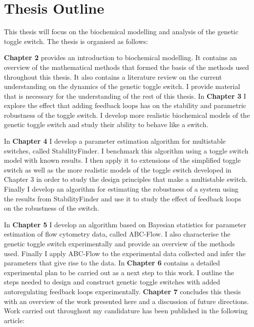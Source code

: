 
\section{Thesis Outline}

This thesis will focus on the biochemical modelling and analysis of the genetic toggle switch. The thesis is organised as follows:

\vskip 0.1in
\noindent \textbf{Chapter 2} provides an introduction to biochemical modelling. It contains an overview of the mathematical methods that formed the basis of the methods used throughout this thesis. It also contains a literature review on the current understanding on the dynamics of the genetic toggle switch. I provide material that is necessary for the understanding of the rest of this thesis. 
\vskip 0.1in
\noindent In \textbf{Chapter 3} I explore the effect that adding feedback loops has on the stability and parametric robustness of the toggle switch. I develop more realistic biochemical models of the genetic toggle switch and study their ability to behave like a switch.  

\vskip 0.1in
\noindent In \textbf{Chapter 4} I develop a parameter estimation algorithm for multistable switches, called StabilityFinder. I benchmark this algorithm using a toggle switch model with known results. I then apply it to extensions of the simplified toggle switch as well as the more realistic models of the toggle switch developed in Chapter 3 in order to study the design principles that make a multistable switch. Finally I develop an algorithm for estimating the robustness of a system using the results from StabilityFinder and use it to study the effect of feedback loops on the robustness of the switch.  

\vskip 0.1in
\noindent In \textbf{Chapter 5} I develop an algorithm based on Bayesian statistics for parameter estimation of flow cytometry data, called ABC-Flow. I also characterise the genetic toggle switch experimentally and provide an overview of the methods used. Finally I apply ABC-Flow to the experimental data collected and infer the parameters that give rise to the data.
\vskip 0.1in
\noindent In \textbf{Chapter 6} contains a detailed experimental plan to be carried out as a next step to this work. I outline the steps needed to design and construct genetic toggle switches with added autoregulating feedback loops experimentally. 
\vskip 0.1in
\noindent \textbf{Chapter 7} concludes this thesis with an overview of the work presented here and a discussion of future directions. 
\vskip 0.1in
\noindent Work carried out throughout my candidature has been published in the following article:

